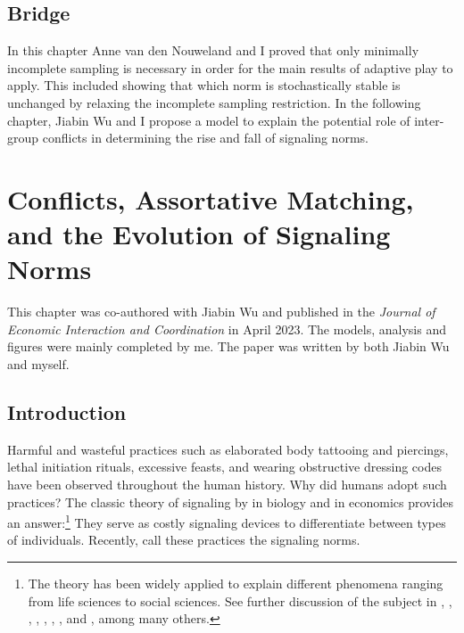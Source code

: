 \section{Bridge}
In this chapter Anne van den Nouweland and I proved that only minimally incomplete sampling is necessary in order for the main results of adaptive play to apply. This included showing that which norm is stochastically stable is unchanged by relaxing the incomplete sampling restriction. In the following chapter, Jiabin Wu and I propose a model to explain the potential role of inter-group conflicts in determining the rise and fall of signaling norms.


\chapter{Conflicts, Assortative Matching, and the Evolution of Signaling Norms}

This chapter was co-authored with Jiabin Wu and published in the \textit{Journal of Economic Interaction and Coordination} in April 2023. The models, analysis and figures were mainly completed by me. The paper was written by both Jiabin Wu and myself. 

\section{Introduction}
Harmful and wasteful practices such as elaborated body tattooing and piercings, lethal initiation rituals, excessive feasts, and wearing obstructive dressing codes have been observed throughout the human history. Why did humans adopt such practices? The classic theory of signaling by \cite{Zahavi1975} in biology and \cite{Spence1973} in economics provides an answer:\footnote{The theory has been widely applied to explain different phenomena ranging from life sciences to social sciences. See further discussion of the subject in \cite{Grafen1990}, \cite{MaynardSmithHarper1995}, \cite{Johnstone1997},  \cite{ZahaviZahavi1997}, \cite{MaynardSmithHarper2003}, \cite{SearcyNowicki2005}, \cite{Getty2006}, \cite{Grose2011} and \cite{Szamado2012}, among many others.} They serve as costly signaling devices to differentiate between types of individuals. Recently, \cite{PrzepiorkaDiekmann2021} call these practices the signaling norms. 

